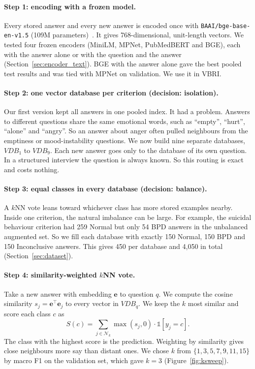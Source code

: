 \documentclass[11pt]{article}
\newcommand{\vbri}{VBRI}
\begin{document}
\paragraph{Step 1: encoding with a frozen model.}
Every stored answer and every new answer is encoded once with \texttt{BAAI/bge-base-en-v1.5}
(109M parameters)~\cite{xiao2023cpack}. It gives 768-dimensional, unit-length vectors. We tested
four frozen encoders (MiniLM, MPNet, PubMedBERT and BGE), each with the answer alone or with the
question and the answer (Section~\ref{sec:encoder_text}). BGE with the answer alone gave the best
pooled test results and was tied with MPNet on validation. We use it in \vbri{}.

\paragraph{Step 2: one vector database per criterion (decision: isolation).}
Our first version kept all answers in one pooled index. It had a problem. Answers to different questions
share the same emotional words, such as ``empty'', ``hurt'', ``alone'' and ``angry''. So an answer
about anger often pulled neighbours from the emptiness or mood-instability questions. We now build
nine separate databases, $VDB_1$ to $VDB_9$. Each new answer goes only to the database of its own
question. In a structured interview the question is always known. So this routing is exact and
costs nothing.

\paragraph{Step 3: equal classes in every database (decision: balance).}
A $k$NN vote leans toward whichever class has more stored examples nearby. Inside one criterion, the
natural imbalance can be large. For example, the suicidal behaviour criterion had 259 Normal but
only 54 BPD answers in the unbalanced augmented set. So we fill each database with exactly 150
Normal, 150 BPD and 150 Inconclusive answers. This gives 450 per database and 4,050 in total
(Section~\ref{sec:dataset}).

\paragraph{Step 4: similarity-weighted $k$NN vote.}
Take a new answer with embedding $\mathbf{e}$ to question $q$. We compute the cosine similarity
$s_j = \mathbf{e}^\top \mathbf{e}_j$ to every vector in $VDB_q$. We keep the $k$ most similar and
score each class $c$ as
\begin{equation}
S(c) = \sum_{j \in \mathcal{N}_k} \max(s_j, 0)\cdot \mathbb{1}[y_j = c].
\label{eq:voting}
\end{equation}
The class with the highest score is the prediction. Weighting by similarity gives close neighbours
more say than distant ones. We chose $k$ from $\{1,3,5,7,9,11,15\}$ by macro F1 on the validation set, which gave $k=3$
(Figure~\ref{fig:ksweep}).
\end{document}
